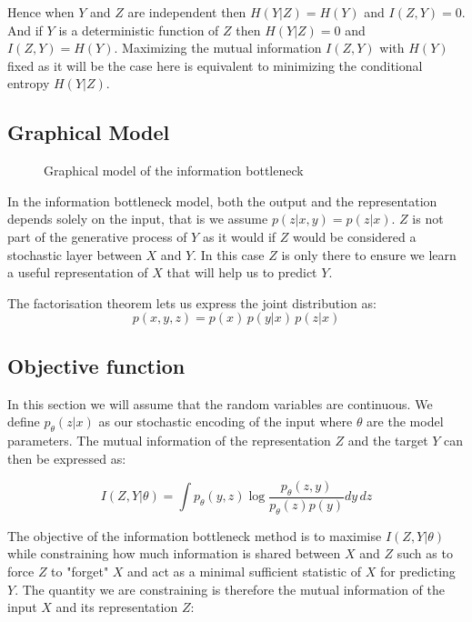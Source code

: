 \documentclass[11pt,oneside,openright]{report}
\begin{document}
Hence when $Y$ and $Z$ are independent then  $H(Y|Z) = H(Y)$ and $I(Z, Y) = 0$.  And if $Y$ is a deterministic function of $Z$ then $H(Y|Z) = 0$ and $I(Z, Y) = H(Y)$. Maximizing the mutual information $I(Z, Y)$ with $H(Y)$ fixed as it will be the case here is equivalent to minimizing the conditional entropy $H(Y|Z)$.

\subsection{Graphical Model}

\begin{figure}[H]
\centering
{}
\caption{Graphical model of the information bottleneck}
\end{figure}

In the information bottleneck model, both the output and the representation depends solely on the input, that is we assume $p(z | x, y) = p(z|x)$. $Z$ is not part of the generative process of $Y$ as it would if $Z$ would be considered a stochastic layer between $X$ and $Y$. In this case $Z$ is only there to ensure we learn a useful representation of $X$ that will help us to predict $Y$.

The factorisation theorem lets us express the joint distribution as:
$$ p(x, y, z) = p(x)\, p(y|x)\, p(z|x)$$

\subsection{Objective function}
In this section we will assume that the random variables are continuous. We define $p_\theta(z|x)$ as our stochastic encoding of the input where $\theta$ are the model parameters. The mutual information of the representation $Z$ and the target $Y$ can then be expressed as:

$$ I(Z, Y|\theta) = \int p_\theta(y, z) \log \frac{p_\theta(z, y)}{p_\theta(z)p(y)} dy\,dz $$

The objective of the information bottleneck method is to maximise $I(Z, Y|\theta)$ while constraining how much information is shared between $X$ and $Z$ such as to force $Z$ to "forget" $X$ and act as a minimal sufficient statistic of $X$ for predicting $Y$. The quantity we are constraining is therefore the mutual information of the input $X$ and its representation $Z$:
\end{document}
